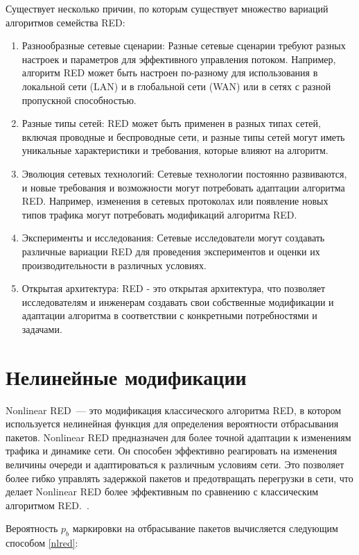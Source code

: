 Существует несколько причин, по которым существует множество вариаций алгоритмов семейства RED:

\begin{enumerate}
\item Разнообразные сетевые сценарии: Разные сетевые сценарии требуют разных настроек и параметров для эффективного управления потоком. Например, алгоритм RED может быть настроен по-разному для использования в локальной сети (LAN) и в глобальной сети (WAN) или в сетях с разной пропускной способностью.
\item Разные типы сетей: RED может быть применен в разных типах сетей, включая проводные и беспроводные сети, и разные типы сетей могут иметь уникальные характеристики и требования, которые влияют на алгоритм.
\item Эволюция сетевых технологий: Сетевые технологии постоянно развиваются, и новые требования и возможности могут потребовать адаптации алгоритма RED. Например, изменения в сетевых протоколах или появление новых типов трафика могут потребовать модификаций алгоритма RED.
\item Эксперименты и исследования: Сетевые исследователи могут создавать различные вариации RED для проведения экспериментов и оценки их производительности в различных условиях.
\item Открытая архитектура: RED - это открытая архитектура, что позволяет исследователям и инженерам создавать свои собственные модификации и адаптации алгоритма в соответствии с конкретными потребностями и задачами.
\end{enumerate}


\section{Нелинейные модификации}
\label{chap2:sec2}

Nonlinear RED~--- это модификация классического алгоритма RED, в
котором используется нелинейная функция для определения
вероятности отбрасывания пакетов. Nonlinear RED предназначен для более точной адаптации к изменениям трафика и динамике сети. 
Он способен эффективно реагировать на изменения величины очереди и адаптироваться к различным условиям сети. 
Это позволяет более гибко управлять задержкой пакетов и предотвращать перегрузки в сети, 
что делает Nonlinear RED более эффективным по сравнению с классическим алгоритмом RED.~\cite{NLRED1, NLRED2}.   


Вероятность $p_{b}$ маркировки на
отбрасывание пакетов вычисляется следующим способом \eqref{nlred}:

